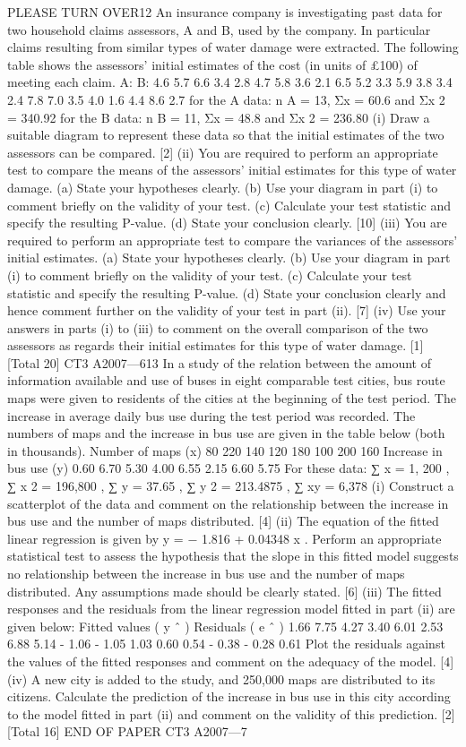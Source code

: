 PLEASE TURN OVER12
An insurance company is investigating past data for two household claims assessors,
A and B, used by the company. In particular claims resulting from similar types of
water damage were extracted. The following table shows the assessors’ initial
estimates of the cost (in units of £100) of meeting each claim.
A:
B:
4.6
5.7
6.6
3.4
2.8
4.7
5.8
3.6
2.1
6.5
5.2
3.3
5.9
3.8
3.4
2.4
7.8
7.0
3.5
4.0
1.6
4.4
8.6
2.7
for the A data: n A = 13, Σx = 60.6 and Σx 2 = 340.92
for the B data: n B = 11, Σx = 48.8 and Σx 2 = 236.80
(i) Draw a suitable diagram to represent these data so that the initial estimates of
the two assessors can be compared.
[2]
(ii) You are required to perform an appropriate test to compare the means of the
assessors’ initial estimates for this type of water damage.
(a) State your hypotheses clearly.
(b) Use your diagram in part (i) to comment briefly on the validity of your
test.
(c) Calculate your test statistic and specify the resulting P-value.
(d) State your conclusion clearly.
[10]
(iii)
You are required to perform an appropriate test to compare the variances of
the assessors’ initial estimates.
(a) State your hypotheses clearly.
(b) Use your diagram in part (i) to comment briefly on the validity of your
test.
(c) Calculate your test statistic and specify the resulting P-value.
(d) State your conclusion clearly and hence comment further on the
validity of your test in part (ii).
[7]
(iv)
Use your answers in parts (i) to (iii) to comment on the overall comparison of
the two assessors as regards their initial estimates for this type of water
damage.
[1]
[Total 20]
CT3 A2007—613
In a study of the relation between the amount of information available and use of
buses in eight comparable test cities, bus route maps were given to residents of the
cities at the beginning of the test period. The increase in average daily bus use during
the test period was recorded. The numbers of maps and the increase in bus use are
given in the table below (both in thousands).
Number of maps (x)
80 220 140 120 180 100 200 160
Increase in bus use (y) 0.60 6.70 5.30 4.00 6.55 2.15 6.60 5.75
For these data:
∑ x = 1, 200 , ∑ x 2 = 196,800 , ∑ y = 37.65 , ∑ y 2 = 213.4875 , ∑ xy = 6,378
(i) Construct a scatterplot of the data and comment on the relationship between
the increase in bus use and the number of maps distributed.
[4]
(ii) The equation of the fitted linear regression is given by y = − 1.816 + 0.04348 x .
Perform an appropriate statistical test to assess the hypothesis that the slope in
this fitted model suggests no relationship between the increase in bus use and
the number of maps distributed. Any assumptions made should be clearly
stated.
[6]
(iii) The fitted responses and the residuals from the linear regression model fitted
in part (ii) are given below:
Fitted values ( y ˆ )
Residuals ( e ˆ )
1.66 7.75 4.27 3.40 6.01 2.53 6.88 5.14
- 1.06 - 1.05 1.03 0.60 0.54 - 0.38 - 0.28 0.61
Plot the residuals against the values of the fitted responses and comment on
the adequacy of the model.
[4]
(iv)
A new city is added to the study, and 250,000 maps are distributed to its
citizens.
Calculate the prediction of the increase in bus use in this city according to the
model fitted in part (ii) and comment on the validity of this prediction.
[2]
[Total 16]
END OF PAPER
CT3 A2007—7



